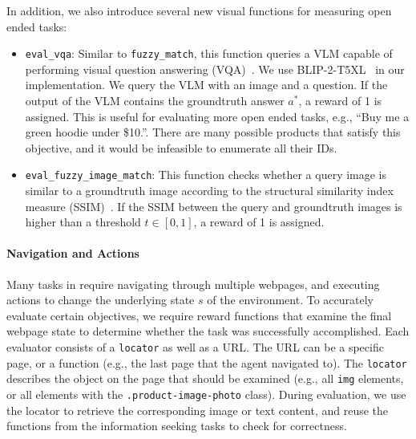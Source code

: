 In addition, we also introduce several new visual functions for measuring open ended tasks:
\begin{itemize}
    \item \texttt{eval\_vqa}: Similar to \texttt{fuzzy\_match}, this function queries a VLM capable of performing visual question answering (VQA)~\citep{antol2015vqa}. We use BLIP-2-T5XL~\citep{li2023blip} in our implementation. We query the VLM with an image and a question. If the output of the VLM contains the groundtruth answer $a^*$, a reward of 1 is assigned. %
    This is useful for evaluating more open ended tasks, e.g., ``Buy me a green hoodie under \$10.''. There are many possible products that satisfy this objective, and it would be infeasible to enumerate all their IDs.
    \item \texttt{eval\_fuzzy\_image\_match}: This function checks whether a query image is similar to a groundtruth image according to the structural similarity index measure (SSIM)~\citep{wang2004image}. If the SSIM between the query and groundtruth images is higher than a threshold $t \in [0, 1]$, a reward of 1 is assigned. %
\end{itemize}

\paragraph{Navigation and Actions} 

Many tasks in \BenchmarkName{} require navigating through multiple webpages, and executing actions to change the underlying state $s$ of the environment. To accurately evaluate certain objectives, we require reward functions that examine the final webpage state to determine whether the task was successfully accomplished. %
Each evaluator consists of a \texttt{locator} as well as a URL. The URL can be a specific page, or a function (e.g., the last page that the agent navigated to). The \texttt{locator} describes the object on the page that should be examined (e.g., all \texttt{img} elements, or all elements with the \texttt{.product-image-photo} class). During evaluation, we use the locator to retrieve the corresponding image or text content, and reuse the functions from the information seeking tasks to check for correctness. 


